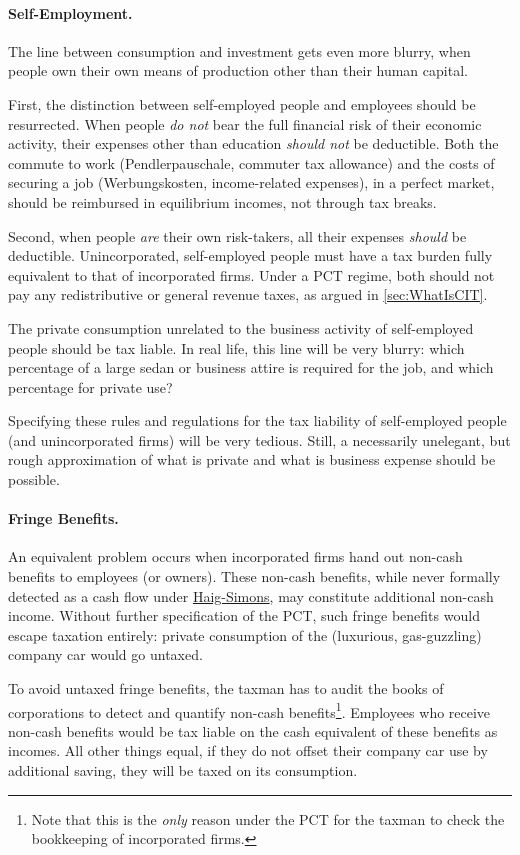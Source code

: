 \paragraph{Self-Employment.} The line between consumption and investment gets even more blurry, when people own their own means of production other than their human capital.

First, the distinction between self-employed people and employees should be resurrected. When people \emph{do not} bear the full financial risk of their economic activity, their expenses other than education \emph{should not} be deductible. Both the commute to work (Pendlerpauschale, commuter tax allowance) and the costs of securing a job (Werbungskosten, income-related expenses), in a perfect market, should be reimbursed in equilibrium incomes, not through tax breaks.

Second, when people \emph{are} their own risk-takers, all their expenses \emph{should} be deductible. Unincorporated, self-employed people must have a tax burden fully equivalent to that of incorporated firms. Under a PCT regime, both should not pay any redistributive or general revenue taxes, as argued in \autoref{sec:WhatIsCIT}.

The private consumption unrelated to the business activity of self-employed people should be tax liable. In real life, this line will be very blurry: which percentage of a large sedan or business attire is required for the job, and which percentage for private use?

Specifying these rules and regulations for the tax liability of self-employed people (and unincorporated firms) will be very tedious. Still, a necessarily unelegant, but rough approximation of what is private and what is business expense should be possible.

\paragraph{Fringe Benefits.} An equivalent problem occurs when incorporated firms hand out non-cash benefits to employees (or owners). These non-cash benefits, while never formally detected as a cash flow under \hyperref[eq:HaigSimonsPCT]{Haig-Simons}, may constitute additional non-cash income. Without further specification of the PCT, such fringe benefits would escape taxation entirely: private consumption of the (luxurious, gas-guzzling) company car would go untaxed.

To avoid untaxed fringe benefits, the taxman has to audit the books of corporations to detect and quantify non-cash benefits\footnote{
	Note that this is the \emph{only} reason under the PCT for the taxman to check the bookkeeping of incorporated firms.}.
Employees who receive non-cash benefits would be tax liable on the cash equivalent of these benefits as incomes. All other things equal, if they do not offset their company car use by additional saving, they will be taxed on its consumption.

